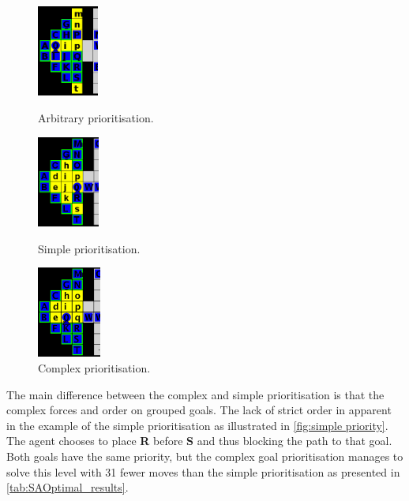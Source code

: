 \begin{figure}[h!]
  \centering
  \begin{minipage}{.30\columnwidth}
    \centering
    \includegraphics[height=3cm]{graphics/no_priority_block.png}
    \caption{\label{fig:no priority}Arbi\-tra\-ry prioritisation.}
  \end{minipage}%
  \hspace{10pt}%
  \begin{minipage}{.30\columnwidth}
    \centering
    \includegraphics[height=3cm]{graphics/simple_priority_block.PNG}
    \caption{\label{fig:simple priority}Simple prioritisation.}
  \end{minipage}%
  \hspace{10pt}%
  \begin{minipage}{.30\columnwidth}
    \centering
    \includegraphics[height=3cm]{graphics/complex_priority.png}
    \caption{\label{fig:no priority}Comp\-lex prioritisation.}
  \end{minipage}
\end{figure}


The main difference between the complex and simple prioritisation is that the complex forces and order on grouped goals.
The lack of strict order in apparent in the example of the simple prioritisation as illustrated in \cref{fig:simple priority}.
The agent chooses to place \textbf{R} before \textbf{S} and thus blocking the path to that goal.
Both goals have the same priority, but the complex goal prioritisation manages to solve this level with 31 fewer moves than the simple prioritisation as presented in \cref{tab:SAOptimal_results}.

